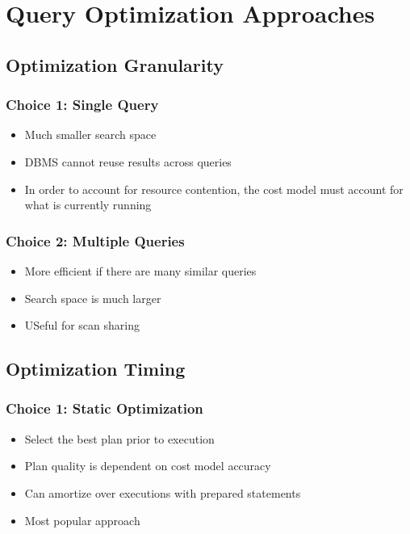 \documentclass[11pt]{article}
\begin{document}
\section{Query Optimization Approaches}

    \subsection*{Optimization Granularity}
        \subsubsection*{Choice 1: Single Query}
        \begin{itemize}
            \item Much smaller search space
            \item DBMS cannot reuse results across queries
            \item In order to account for resource contention, the cost model must account for what is currently running
        \end{itemize}

        \subsubsection*{Choice 2: Multiple Queries}
        \begin{itemize}
            \item More efficient if there are many similar queries
            \item Search space is much larger
            \item USeful for scan sharing
        \end{itemize}

    \subsection*{Optimization Timing}

        \subsubsection*{Choice 1: Static Optimization}
        \begin{itemize}
            \item Select the best plan prior to execution
            \item Plan quality is dependent on cost model accuracy
            \item Can amortize over executions with prepared statements
            \item Most popular approach
        \end{itemize}
\end{document}
